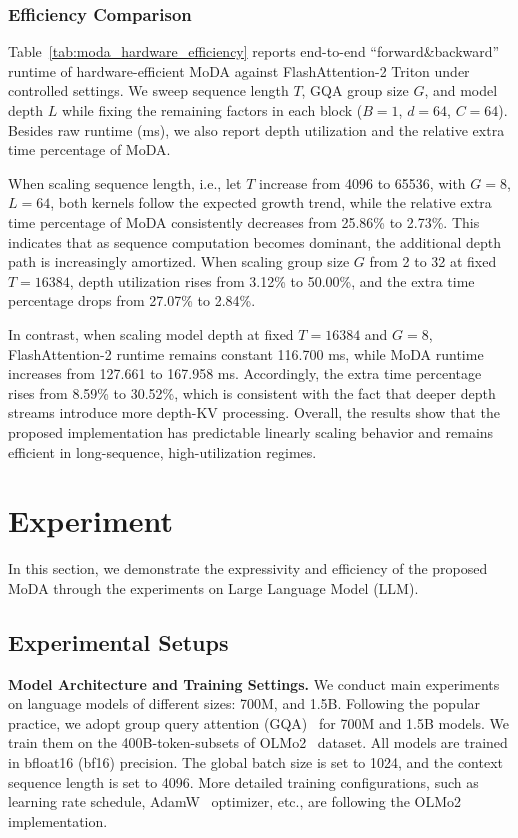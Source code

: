 \documentclass[]{bytedance_seed}
\newcommand{\myPara}[1]{\vspace{.05in}\noindent\textbf{#1.}}
\newcommand{\name}{MoDA}
\begin{document}
\subsubsection{Efficiency Comparison}

Table~\ref{tab:moda_hardware_efficiency} reports end-to-end ``forward\&backward'' runtime of hardware-efficient \name{} against FlashAttention-2 Triton under controlled settings.
We sweep sequence length $T$, GQA group size $G$, and model depth $L$ while fixing the remaining factors in each block ($B{=}1$, $d{=}64$, $C{=}64$).
Besides raw runtime (ms), we also report depth utilization and the relative extra time percentage of \name{}.

When scaling sequence length, i.e., let $T$ increase from 4096 to 65536, with $G{=}8$, $L{=}64$, both kernels follow the expected growth trend, while the relative extra time percentage of \name{} consistently decreases from 25.86\% to 2.73\%.
This indicates that as sequence computation becomes dominant, the additional depth path is increasingly amortized.
When scaling group size $G$ from 2 to 32 at fixed $T{=}16384$, depth utilization rises from 3.12\% to 50.00\%, and the extra time percentage drops from 27.07\% to 2.84\%.

In contrast, when scaling model depth at fixed $T{=}16384$ and $G{=}8$, FlashAttention-2 runtime remains constant 116.700 ms, while \name{} runtime increases from 127.661 to 167.958 ms.
Accordingly, the extra time percentage rises from 8.59\% to 30.52\%, which is consistent with the fact that deeper depth streams introduce more depth-KV processing.
Overall, the results show that the proposed implementation has predictable linearly scaling behavior and remains efficient in long-sequence, high-utilization regimes.










\section{Experiment}
In this section, we demonstrate the expressivity and efficiency of the proposed \name{} through the experiments on Large Language Model (LLM).

\subsection{Experimental Setups}
\myPara{Model Architecture and Training Settings}
We conduct main experiments on language models of different sizes: 700M, and 1.5B.
Following the popular practice, we adopt group query attention (GQA)~\cite{ainslie2023gqa} for 700M and 1.5B models.
We train them on the 400B-token-subsets of OLMo2~\cite{olmo2024olmo2} dataset.
All models are trained in bfloat16 (bf16) precision.
The global batch size is set to 1024, and the context sequence length is set to 4096.
More detailed training configurations, such as learning rate schedule, AdamW~\cite{loshchilov2018decoupled} optimizer, etc., are following the OLMo2~\cite{olmo2024olmo2} implementation.
\end{document}

